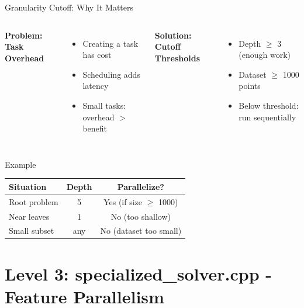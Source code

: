 \documentclass{beamer}
\begin{document}
\begin{frame}{Granularity Cutoff: Why It Matters}
\begin{columns}
\textbf{Problem: Task Overhead}
\begin{itemize}
    \item Creating a task has cost
    \item Scheduling adds latency
    \item Small tasks: overhead $>$ benefit
\end{itemize}

\textbf{Solution: Cutoff Thresholds}
\begin{itemize}
    \item Depth $\geq$ 3 (enough work)
    \item Dataset $\geq$ 1000 points
    \item Below threshold: run sequentially
\end{itemize}
\end{columns}

\vspace{1em}
\begin{exampleblock}{Example}
\begin{tabular}{|l|c|c|}
\hline
\textbf{Situation} & \textbf{Depth} & \textbf{Parallelize?} \\
\hline
Root problem & 5 & Yes (if size $\geq$ 1000) \\
\hline
Near leaves & 1 & No (too shallow) \\
\hline
Small subset & any & No (dataset too small) \\
\hline
\end{tabular}
\end{exampleblock}
\end{frame}

\section{Level 3: specialized\_solver.cpp - Feature Parallelism}
\end{document}
